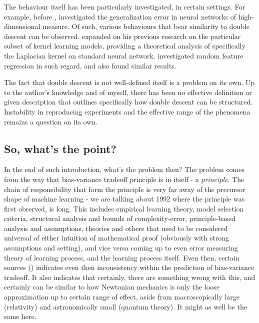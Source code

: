 The behaviour itself has been particularly investigated, in certain settings. For example, before \cite{belkin_reconciling_2019}, \cite{advani2017highdimensionaldynamicsgeneralizationerror} investigated the generalization error in neural networks of high-dimensional measure. Of such, various behaviours that bear similarity to double descent can be observed. \cite{belkin2018understanddeeplearningneed} expanded on his previous research on the particular subset of kernel learning models, providing a theoretical analysis of specifically the Laplacian kernel on standard neural network. \cite{mei2020generalizationerrorrandomfeatures} investigated random feature regression in such regard, and also found similar results. 

The fact that double descent is not well-defined itself is a problem on its own. Up to the author's knowledge and of myself, there has been no effective definition or given description that outlines specifically how double descent can be structured. Instability in reproducing experiments and the effective range of the phenomena remains a question on its own. 

\subsection{So, what's the point?}
In the end of such introduction, what's the problem then? The problem comes from the way that bias-variance tradeoff principle is in itself - a \textit{principle}. The chain of responsibility that form the principle is very far away of the precursor shape of machine learning - we are talking about 1992 where the principle was first observed, is long. This includes empirical learning theory, model selection criteria, structural analysis and bounds of complexity-error, principle-based analysis and assumptions, theories and others that used to be considered universal of either intuition of mathematical proof (obviously with strong assumptions and setting), and vice versa coming up to even error measuring theory of learning process, and the learning process itself. Even then, certain sources (\cite{neal2019biasvariancetradeofftextbooksneed}) indicates even then inconsistency within the prediction of bias-variance tradeoff. It also indicates that certainly, there are something wrong with this, and certainly can be similar to how Newtonian mechanics is only the loose approximation up to certain range of effect, aside from macroscopically large (relativity) and astronomically small (quantum theory). It might as well be the same here. 

